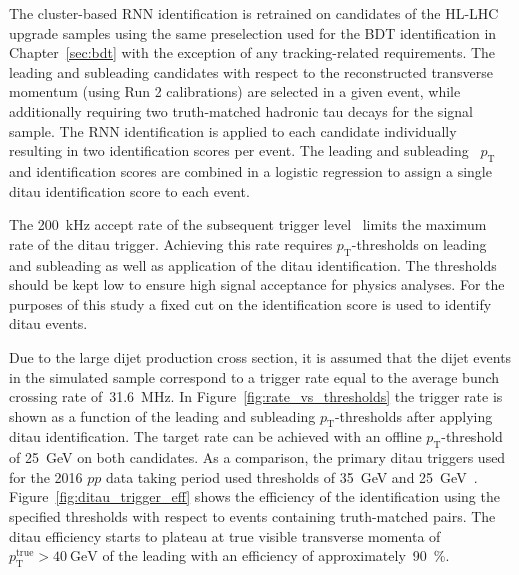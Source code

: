 The cluster-based RNN identification is retrained on \tauhadvis candidates of
the HL-LHC upgrade samples using the same preselection used for the BDT
identification in Chapter~\ref{sec:bdt} with the exception of any
tracking-related requirements. The leading and subleading \tauhadvis candidates
with respect to the reconstructed transverse momentum (using Run 2 calibrations)
are selected in a given event, while additionally requiring two truth-matched
hadronic tau decays for the signal sample. The RNN identification is applied to
each \tauhadvis candidate individually resulting in two identification scores
per event. The leading and subleading \tauhadvis~$p_\text{T}$ and identification
scores are combined in a logistic regression to assign a single ditau
identification score to each event.

The \SI{200}{\kilo\hertz} accept rate of the subsequent trigger
level~\cite{phase_2_scoping} limits the maximum rate of the ditau trigger.
Achieving this rate requires $p_\text{T}$-thresholds on leading and subleading
\tauhadvis as well as application of the ditau identification. The thresholds
should be kept low to ensure high signal acceptance for physics analyses. For
the purposes of this study a fixed cut on the identification score  is used to identify ditau events.

Due to the large dijet production cross section, it is assumed that the dijet
events in the simulated sample correspond to a trigger rate equal to the average
bunch crossing rate of~\SI{31.6}{\mega\hertz}. In
Figure~\ref{fig:rate_vs_thresholds} the trigger rate is shown as a function of
the leading and subleading \tauhadvis $p_\text{T}$-thresholds after applying
ditau identification. The target rate can be achieved with an offline
$p_\text{T}$-threshold of \SI{25}{\GeV} on both \tauhadvis candidates. As a
comparison, the primary ditau triggers used for the 2016 $pp$ data taking period
used thresholds of \SI{35}{\GeV} and \SI{25}{\GeV}~\cite{tautrigger_run2}.
Figure~\ref{fig:ditau_trigger_eff}  shows the
efficiency of the identification using the specified thresholds with respect to
events containing truth-matched \tauhadvis pairs. The ditau efficiency starts to
plateau at true visible transverse momenta
of~$p_\text{T}^\text{true} > \SI{40}{\GeV}$ of the leading \tauhadvis with an
efficiency of approximately~\SI{90}{\percent}.

